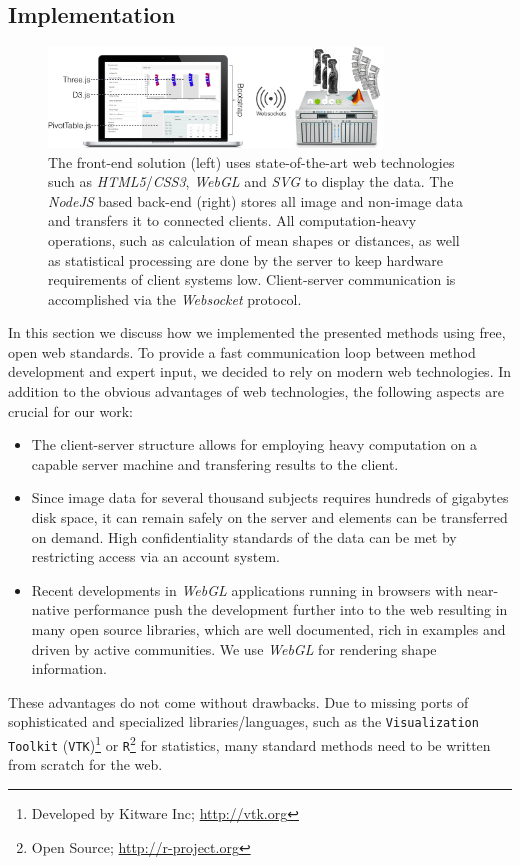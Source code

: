 \documentclass[journal]{style/vgtc} 			          %
\begin{document}
\subsection{Implementation}
\begin{figure}[htb]
 \centering
 \label{fig:technologies}
 \includegraphics[width=3.5in]{figures/technologies}
 \caption{The front-end solution (left) uses state-of-the-art web technologies such as \emph{HTML5}/\emph{CSS3}, \emph{WebGL} and \emph{SVG} to display the data.
 The \emph{NodeJS} based back-end (right) stores all image and non-image data and transfers it to connected clients.
 All computation-heavy operations, such as calculation of mean shapes or distances, as well as statistical processing are done by the server to keep hardware requirements of client systems low. 
 Client-server communication is accomplished via the \emph{Websocket} protocol.
 }
\end{figure}
In this section we discuss how we implemented the presented methods using free, open web standards.
%
To provide a fast communication loop between method development and expert input, we decided to rely on modern web technologies.
%
In addition to the obvious advantages of web technologies, the following aspects are crucial for our work:
\begin{itemize}
	\item The client-server structure allows for employing heavy computation on a capable server machine and transfering results to the client.
	\item Since image data for several thousand subjects requires hundreds of gigabytes disk space, it can remain safely on the server and elements can be transferred on demand.
	High confidentiality standards of the data can be met by restricting access via an account system.
	\item Recent developments in \emph{WebGL} applications running in browsers with near-native performance push the development further into to the web resulting in many open source libraries, which are well documented, rich in examples and driven by active communities. We use \emph{WebGL} for rendering shape information.
\end{itemize}
These advantages do not come without drawbacks.
%
Due to missing ports of sophisticated and specialized libraries/languages, such as the \texttt{Visualization Toolkit} (\texttt{VTK})\footnote{Developed by Kitware Inc; \url{http://vtk.org}} or \texttt{R}\footnote{Open Source; \url{http://r-project.org}} for statistics, many standard methods need to be written from scratch for the web.
%
\end{document}
